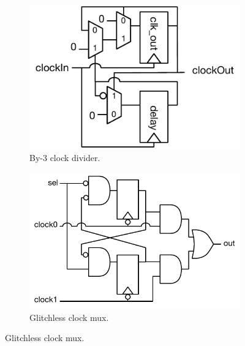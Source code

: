 \begin{figure}
    \centering
    \begin{subfigure}[t]{0.35\textwidth}
        \captionsetup{margin=0.25cm}
        \includegraphics[width=\columnwidth]{figures/clock-div3.pdf}
        \caption{By-3 clock divider.}
        \label{fig:by3-clock-div}
    \end{subfigure}
    \hspace{-1cm}
    \begin{subfigure}[t]{0.40\textwidth}
        \captionsetup{margin=0.25cm}
        \includegraphics[width=\columnwidth]{figures/clock-mux-glitchless.pdf}
        \caption{Glitchless clock mux.}
        \label{fig:clock-mux-glitchless}

\end{subfigure}
\end{figure}
